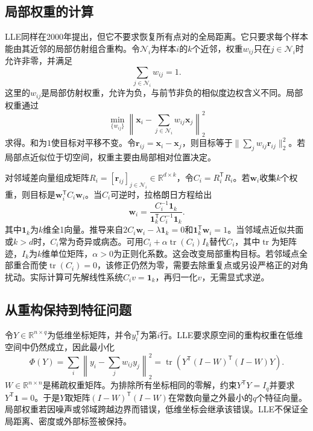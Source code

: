 \subsection{局部权重的计算}
LLE同样在2000年提出，但它不要求恢复所有点对的全局距离\cite{roweis2000lle}。它只要求每个样本能由其近邻的局部仿射组合重构。令$\mathcal N_i$为样本$i$的$k$个近邻，权重$w_{ij}$只在$j\in\mathcal N_i$时允许非零，并满足
\begin{equation}
 \sum_{j\in\mathcal N_i}w_{ij}=1 .
 \label{eq:lle-affine-constraint}
\end{equation}
这里的$w_{ij}$是局部仿射权重，允许为负，与前节非负的相似度边权含义不同。局部权重通过
\begin{equation}
 \min_{\{w_{ij}\}}\left\|\bm x_i-\sum_{j\in\mathcal N_i}w_{ij}\bm x_j\right\|_2^2
 \label{eq:lle-local-objective}
\end{equation}
求得。和为$1$使目标对平移不变。令$\bm r_{ij}=\bm x_i-\bm x_j$，则目标等于$\|\sum_jw_{ij}\bm r_{ij}\|_2^2$。若局部点近似位于切空间，权重主要由局部相对位置决定。

对邻域差向量组成矩阵$R_i=[\bm r_{ij}]_{j\in\mathcal N_i}\in\mathbb R^{d\times k}$，令$C_i=R_i^{\mathsf T}R_i$。若$\bm w_i$收集$k$个权重，则目标是$\bm w_i^{\mathsf T}C_i\bm w_i$。当$C_i$可逆时，拉格朗日方程给出
\begin{equation}
 \bm w_i=\frac{C_i^{-1}\bm1_k}{\bm1_k^{\mathsf T}C_i^{-1}\bm1_k}.
 \label{eq:lle-local-weights}
\end{equation}
其中$\bm1_k$为$k$维全1向量。推导来自$2C_i\bm w_i-\lambda\bm1_k=0$和$\bm1_k^{\mathsf T}\bm w_i=1$。当邻域点近似共面或$k>d$时，$C_i$常为奇异或病态。可用$C_i+\alpha\operatorname{tr}(C_i)I_k$替代$C_i$，其中$\operatorname{tr}$为矩阵迹，$I_k$为$k$维单位矩阵，$\alpha>0$为正则化系数。这会改变局部重构目标。若邻域点全部重合而使$\operatorname{tr}(C_i)=0$，该修正仍然为零，需要去除重复点或另设严格正的对角扰动。实际计算可先解线性系统$C_i v=\bm1_k$，再归一化$v$，无需显式求逆。

\subsection{从重构保持到特征问题}
令$Y\in\mathbb R^{n\times q}$为低维坐标矩阵，并令$y_i^{\mathsf T}$为第$i$行。LLE要求原空间的重构权重在低维空间中仍然成立，因此最小化
\begin{equation}
 \Phi(Y)=\sum_i\left\|y_i-\sum_jw_{ij}y_j\right\|_2^2
 =\operatorname{tr}\left(Y^{\mathsf T}(I-W)^{\mathsf T}(I-W)Y\right).
 \label{eq:lle-embedding-objective}
\end{equation}
$W\in\mathbb R^{n\times n}$是稀疏权重矩阵。为排除所有坐标相同的零解，约束$Y^{\mathsf T}Y=I_q$并要求$Y^{\mathsf T}\bm1=0$。于是$Y$取矩阵$(I-W)^{\mathsf T}(I-W)$在常数向量之外最小的$q$个特征向量。局部权重若因噪声或邻域跨越边界而错误，低维坐标会继承该错误。LLE不保证全局距离、密度或外部标签被保持。


